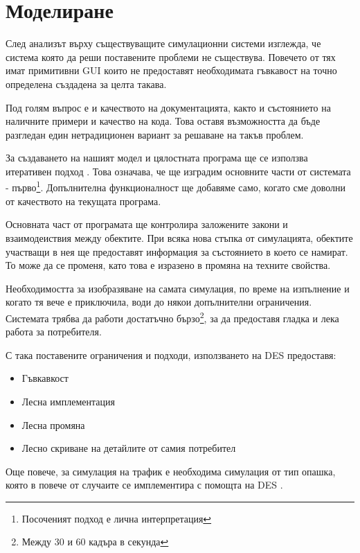 \section{Моделиране}
	
	След анализът върху съществуващите симулационни системи изглежда, че
	система която да реши поставените проблеми не съществува.
	Повечето от тях имат примитивни \ac{GUI} които не предоставят
	необходимата гъвкавост на точно определена създадена за целта такава.
	
	Под голям въпрос е и качеството на документацията, както и състоянието на
	наличните примери и качество на кода. Това оставя възможността да бъде разгледан
	един нетрадиционен вариант за решаване на такъв проблем.
	
	За създаването на нашият модел и цялостната програма ще се използва итеративен подход \cite{ArtOfAgile}.
	Това означава, че ще изградим основните части от системата - 
	първо\footnote{Посоченият подход е лична интерпретация}. Допълнителна 
	функционалност ще добавяме само, когато сме доволни от качеството на текущата програма. 
			
	Основната част от програмата ще контролира заложените закони и взаимодеиствия	между обектите.
	При всяка нова стъпка от симулацията, обектите участващи в нея ще предоставят информация за
	състоянието в което се намират. То може да се променя, като това е изразено в промяна
	на техните свойства.
	
	Необходимостта за изобразяване на самата симулация, по време на изпълнение и когато тя вече е приключила,
	води до някои допълнителни ограничения. Системата трябва да работи достатъчно бързо\footnote{Между 30 и 60 кадъра в секунда},
	за да предоставя гладка и лека работа за потребителя.
	
	С така поставените ограничения и подходи, използването на \ac{DES} предоставя:
	
	\begin{itemize}
		\item Гъвкавкост
		
		\item Лесна имплементация
		
		\item Лесна промяна
		
		\item Лесно скриване на детайлите от самия потребител	
				
	\end{itemize}				
	
	Още повече, за симулация на трафик е необходима симулация от тип опашка, която в повече от случаите
	се имплементира с помощта на \ac{DES} \cite{Barlas}.
	
